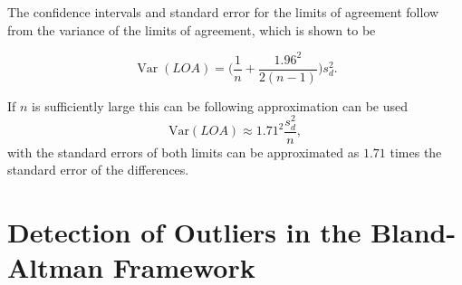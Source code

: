 \documentclass[12pt, a4paper]{report}
\theoremstyle{plain}
\theoremstyle{definition}
\theoremstyle{remark}
\begin{document}
The confidence intervals and standard error for the limits of agreement follow from the variance of the limits of agreement, which is shown to be

\[
\operatorname{Var}(LOA) = \bigg(\frac{1}{n}+\frac{1.96^{2}}{2(n-1)}\bigg)s_{d}^{2}.
\]

If $n$ is sufficiently large this can be following approximation can be used
\[
\mbox{Var}(LOA) \approx 1.71^{2}\frac{s_{d}^{2}}{n},
\]
with the standard errors of both limits can be approximated as $1.71$ times the standard error of the differences.



\section{Detection of Outliers in the Bland-Altman Framework}
\end{document}
